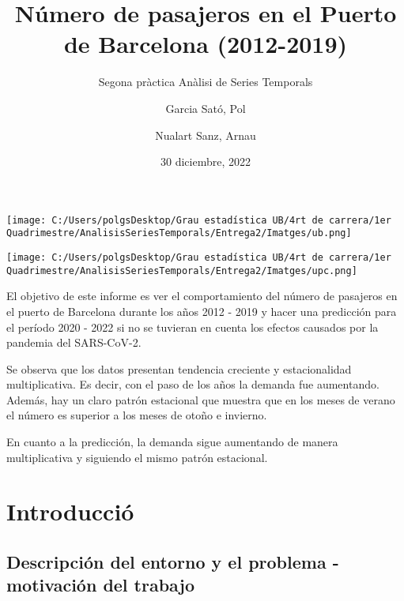 \documentclass[
]{article}
\title{Número de pasajeros en el Puerto de Barcelona (2012-2019)}
\subtitle{Segona pràctica Anàlisi de Series Temporals}
\author{Garcia Sató, Pol \and Nualart Sanz, Arnau}
\date{30 diciembre, 2022}
\begin{document}
\maketitle

\renewcommand{\contentsname}{Índex}
\renewcommand{\figurename}{Figura}
\renewcommand{\tablename}{Taula}

\captionsetup{width=.75\textwidth}

\vspace{120mm}

\texttt{[image: C:/Users/polgsDesktop/Grau estadística UB/4rt de carrera/1er Quadrimestre/AnalisisSeriesTemporals/Entrega2/Imatges/ub.png]}

\texttt{[image: C:/Users/polgsDesktop/Grau estadística UB/4rt de carrera/1er Quadrimestre/AnalisisSeriesTemporals/Entrega2/Imatges/upc.png]}

\newpage

\begin{center}
El objetivo de este informe es ver el comportamiento del número de pasajeros en el puerto de Barcelona durante los años 2012 - 2019 y hacer una predicción para el período 2020 - 2022 si no se tuvieran en cuenta los efectos causados por la pandemia del SARS-CoV-2. 

Se observa que los datos presentan tendencia creciente y estacionalidad multiplicativa. Es decir, con el paso de los años la demanda fue aumentando. Además, hay un claro patrón estacional que muestra que en los meses de verano el número es superior a los meses de otoño e invierno. 

En cuanto a la predicción, la demanda sigue aumentando de manera multiplicativa y siguiendo el mismo patrón estacional. 
\end{center}

\pagebreak

\tableofcontents

\pagebreak

\hypertarget{introducciuxf3}{%
\section{Introducció}\label{introducciuxf3}}

\hypertarget{descripciuxf3n-del-entorno-y-el-problema---motivaciuxf3n-del-trabajo}{%
\subsection{Descripción del entorno y el problema - motivación del
trabajo}\label{descripciuxf3n-del-entorno-y-el-problema---motivaciuxf3n-del-trabajo}}
\end{document}
